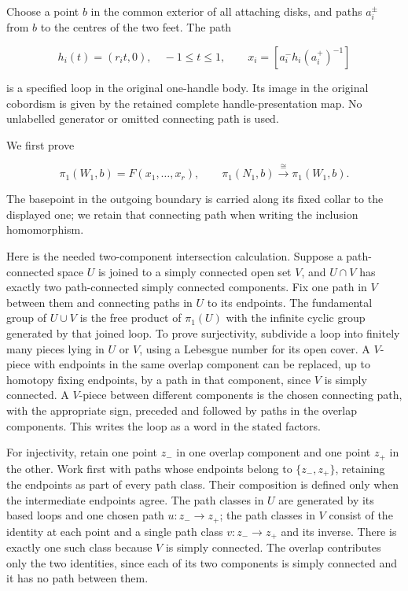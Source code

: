Choose a point \(b\) in the common exterior of all attaching disks, and paths \(a_i^\pm\) from \(b\) to the centres of the two feet. The path

\begin{equation}
h_i(t)=(r_i t,0),\quad -1\leq t\leq1,\qquad
 x_i=[a_i^-h_i(a_i^+)^{-1}]
 \label{courseIII:framed-handle-slides-and-index-one-removal:eq:1.2}
\end{equation}

is a specified loop in the original one-handle body. Its image in the original cobordism is given by the retained complete handle-presentation map. No unlabelled generator or omitted connecting path is used.

We first prove

\begin{equation}
\pi_1(W_1,b)=F(x_1,\ldots,x_r),\qquad
 \pi_1(N_1,b)\xrightarrow{\;\cong\;}\pi_1(W_1,b).
 \label{courseIII:framed-handle-slides-and-index-one-removal:eq:1.3}
\end{equation}

The basepoint in the outgoing boundary is carried along its fixed collar to the displayed one; we retain that connecting path when writing the inclusion homomorphism.

Here is the needed two-component intersection calculation. Suppose a path-connected space \(U\) is joined to a simply connected open set \(V\), and \(U\cap V\) has exactly two path-connected simply connected components. Fix one path in \(V\) between them and connecting paths in \(U\) to its endpoints. The fundamental group of \(U\cup V\) is the free product of \(\pi_1(U)\) with the infinite cyclic group generated by that joined loop. To prove surjectivity, subdivide a loop into finitely many pieces lying in \(U\) or \(V\), using a Lebesgue number for its open cover. A \(V\)-piece with endpoints in the same overlap component can be replaced, up to homotopy fixing endpoints, by a path in that component, since \(V\) is simply connected. A \(V\)-piece between different components is the chosen connecting path, with the appropriate sign, preceded and followed by paths in the overlap components. This writes the loop as a word in the stated factors.

For injectivity, retain one point \(z_-\) in one overlap component and one point \(z_+\) in the other. Work first with paths whose endpoints belong to \(\{z_-,z_+\}\), retaining the endpoints as part of every path class. Their composition is defined only when the intermediate endpoints agree. The path classes in \(U\) are generated by its based loops and one chosen path \(u:z_-\to z_+\); the path classes in \(V\) consist of the identity at each point and a single path class \(v:z_-\to z_+\) and its inverse. There is exactly one such class because \(V\) is simply connected. The overlap contributes only the two identities, since each of its two components is simply connected and it has no path between them.

